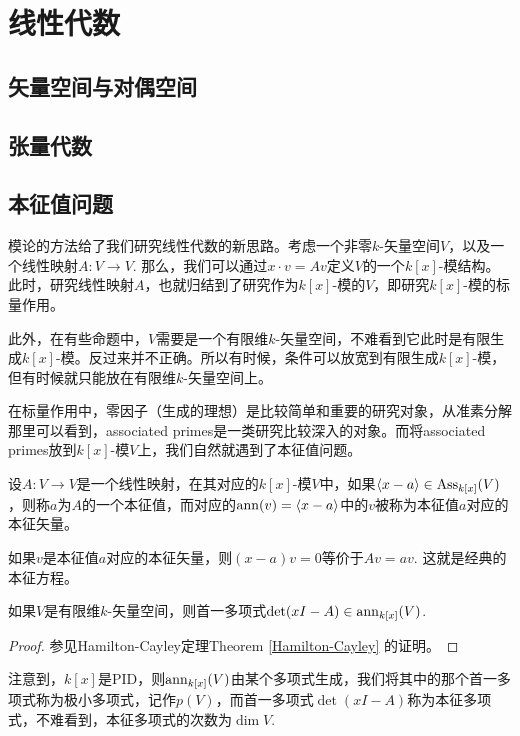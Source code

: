 \chapter{线性代数}
\section{矢量空间与对偶空间}

\section{张量代数}

\section{本征值问题}

模论的方法给了我们研究线性代数的新思路。考虑一个非零$k$-矢量空间$V$，以及一个线性映射$A:V\to V$. 那么，我们可以通过$x\cdot v=Av$定义$V$的一个$k[x]$-模结构。此时，研究线性映射$A$，也就归结到了研究作为$k[x]$-模的$V$，即研究$k[x]$-模的标量作用。

此外，在有些命题中，$V$需要是一个有限维$k$-矢量空间，不难看到它此时是有限生成$k[x]$-模。反过来并不正确。所以有时候，条件可以放宽到有限生成$k[x]$-模，但有时候就只能放在有限维$k$-矢量空间上。

在标量作用中，零因子（生成的理想）是比较简单和重要的研究对象，从准素分解那里可以看到，associated primes是一类研究比较深入的对象。而将associated primes放到$k[x]$-模$V$上，我们自然就遇到了本征值问题。

\begin{para}[本征值与本征矢量]
    设$A:V\to V$是一个线性映射，在其对应的$k[x]$-模$V$中，如果$\langle x-a\rangle\in \operatorname{Ass}_{k[x]}(V)$，则称$a$为$A$的一个本征值，而对应的$\operatorname{ann}(v)=\langle x-a\rangle$中的$v$被称为本征值$a$对应的本征矢量。
\end{para}

如果$v$是本征值$a$对应的本征矢量，则$(x-a)v=0$等价于$Av=av$. 这就是经典的本征方程。

\begin{lem}
    如果$V$是有限维$k$-矢量空间，则首一多项式$\det(xI-A)\in \operatorname{ann}_{k[x]}(V)$.
\end{lem}

\begin{proof}
    参见Hamilton-Cayley定理Theorem \ref{Hamilton-Cayley} 的证明。
\end{proof}

注意到，$k[x]$是PID，则$\operatorname{ann}_{k[x]}(V)$由某个多项式生成，我们将其中的那个首一多项式称为极小多项式，记作$p(V)$，而首一多项式$\det(xI-A)$称为本征多项式，不难看到，本征多项式的次数为$\dim V$.

